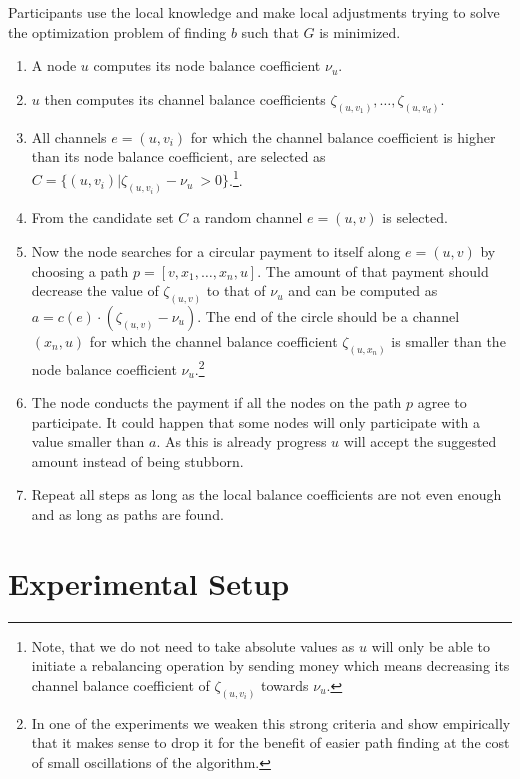 \documentclass[conference]{IEEEtran}
\begin{document}
Participants use the local knowledge and make local adjustments trying to solve the optimization problem of finding $b$ such that $G$ is minimized.
\begin{enumerate}
\item A node $u$ computes its node balance coefficient $\nu_u$.
\item $u$ then computes its channel balance coefficients $\zeta_{(u,v_1)},\dots,\zeta_{(u,v_d)}$.
\item All channels $e=(u,v_i)$ for which the channel balance coefficient is higher 
than its node balance coefficient, are selected as $C = \{(u,v_i) | \zeta_{(u,v_i)} - \nu_u\ > 0\}$.\footnote{
  Note, that we do not need to take absolute values as $u$ will only be able to initiate a rebalancing operation by sending money which means decreasing its channel balance coefficient of $\zeta_{(u,v_i)}$ towards $\nu_u$.}.
\item From the candidate set $C$ a random channel $e=(u,v)$ is selected.
\item Now the node searches for a circular payment to itself along $e=(u,v)$ by choosing a path $p = [v,x_1,\dots,x_n,u]$. The amount of that payment should decrease the value of $\zeta_{(u,v)}$ to that of $\nu_u$ and can be computed as $a = c(e)\cdot (\zeta_{(u,v)}-\nu_u)$. The end of the circle should be a channel $(x_n,u)$ for which the channel balance coefficient $\zeta_{(u,x_n)}$ is smaller than the node balance coefficient $\nu_u$.\footnote{In one of the experiments we weaken this strong criteria and show empirically that it makes sense to drop it for the benefit of easier path finding at the cost of small oscillations of the algorithm.}
\item The node conducts the payment if all the nodes on the path $p$ agree to participate. It could happen that some nodes will only participate with a value smaller than $a$. As this is already progress $u$ will accept the suggested amount instead of being stubborn. 
\item Repeat all steps as long as the local balance coefficients are not even enough and as long as paths are found.
\end{enumerate}

\section{Experimental Setup}
\label{sec:setup}
\end{document}
